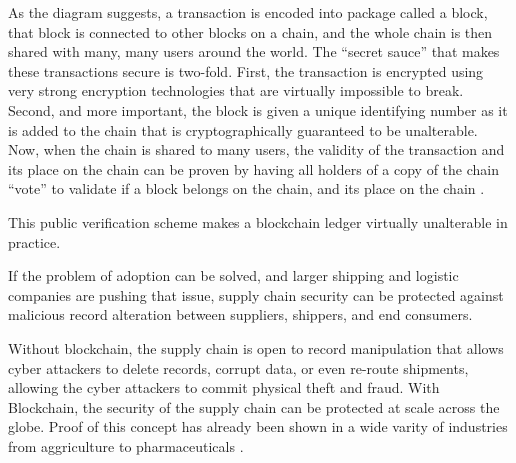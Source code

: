 \documentclass[floatsintext,stu]{apa7}
\begin{document}
As the diagram suggests, a transaction is encoded into package called a block, that block is connected to other blocks on a chain, and the whole chain is then shared with many, many users around the world. The ``secret sauce'' that makes these transactions secure is two-fold. First, the transaction is encrypted using very strong encryption technologies that are virtually impossible to break. Second, and more important, the block is given a unique identifying number as it is added to the chain that is cryptographically guaranteed to be unalterable. Now, when the chain is shared to many users, the validity of the transaction and its place on the chain can be proven by having all holders of a copy of the chain ``vote'' to validate if a block belongs on the chain, and its place on the chain \cite{mearianWhatBlockchainComplete2019}.  

This public verification scheme makes a blockchain ledger virtually unalterable in practice. 

If the problem of adoption can be solved, and larger shipping and logistic companies are pushing that issue, supply chain security can be protected against malicious record alteration between suppliers, shippers, and end consumers. 

Without blockchain, the supply chain is open to record manipulation that allows cyber attackers to delete records, corrupt data, or even re-route shipments, allowing the cyber attackers to commit physical theft and fraud. With Blockchain, the security of the supply chain can be protected at scale across the globe. Proof of this concept has already been shown in a wide varity of industries from aggriculture to pharmaceuticals \cite{tseBlockchainApplicationFood2017}.

\printbibliography
\end{document}
